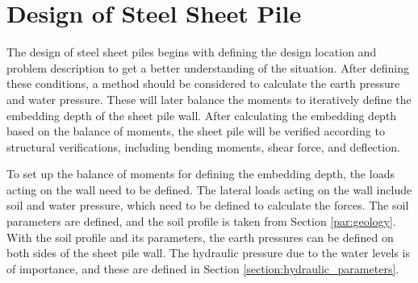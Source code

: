 




\newpage

\section{Design of Steel Sheet Pile}

The design of steel sheet piles begins with defining the design location and problem description to get a better understanding of the situation. After defining these conditions, a method should be considered to calculate the earth pressure and water pressure. These will later balance the moments to iteratively define the embedding depth of the sheet pile wall. After calculating the embedding depth based on the balance of moments, the sheet pile will be verified according to structural verifications, including bending moments, shear force, and deflection.  

To set up the balance of moments for defining the embedding depth, the loads acting on the wall need to be defined. The lateral loads acting on the wall include soil and water pressure, which need to be defined to calculate the forces. The soil parameters are defined, and the soil profile is taken from Section \ref{par:geology}. With the soil profile and its parameters, the earth pressures can be defined on both sides of the sheet pile wall. The hydraulic pressure due to the water levels is of importance, and these are defined in Section \ref{section:hydraulic_parameters}. 

